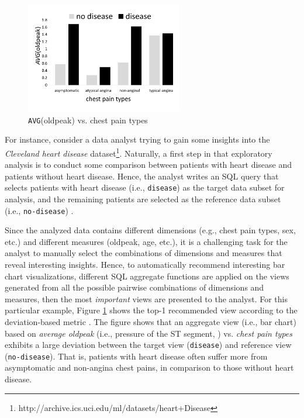 \begin{figure}
	\includegraphics[width=2.7in]{figures/introduction/cp_avg_oldpeak}
	\vspace{-10pt}
	\caption{{\tt AVG}(oldpeak) vs. chest pain types}
	\label{fig:intro1}
	\vspace{-15pt}
\end{figure}



For instance, consider a data analyst trying to gain some insights into the {\em Cleveland heart disease} dataset\footnote{http://archive.ics.uci.edu/ml/datasets/heart+Disease}. 
%
Naturally, a first step in that exploratory analysis is to conduct some comparison between patients with heart disease and patients without heart disease.
%
Hence, the analyst writes an SQL query that selects patients with heart disease (i.e., {\tt disease}) as the target data subset for analysis, and the remaining patients are selected as the reference data subset (i.e., {\tt no-disease}) .

Since the analyzed data contains different dimensions (e.g., chest pain types, sex, etc.) and different measures (oldpeak, age, etc.), it is a challenging task for the analyst to manually select the combinations of dimensions and measures that reveal interesting insights.
%
Hence, to automatically recommend interesting bar chart visualizations, different SQL aggregate functions are applied on the views generated from all the possible pairwise combinations of dimensions and measures, then the most {\em important} views are presented to the analyst.
%
For this particular example, Figure \ref{fig:intro1} shows the top-1 recommended view according to the deviation-based metric \cite{Vartak2015, Vartak2014}. 
%
The figure shows that an aggregate view (i.e., bar chart) based on {\it average oldpeak} (i.e.,  pressure of the ST segment, ) vs. {\it chest pain types} exhibits a large deviation between the target view ({\tt disease}) and reference view ({\tt no-disease}). 
%
That is, patients with heart disease often suffer more from asymptomatic and non-angina chest pains, in comparison to those without heart disease.  

